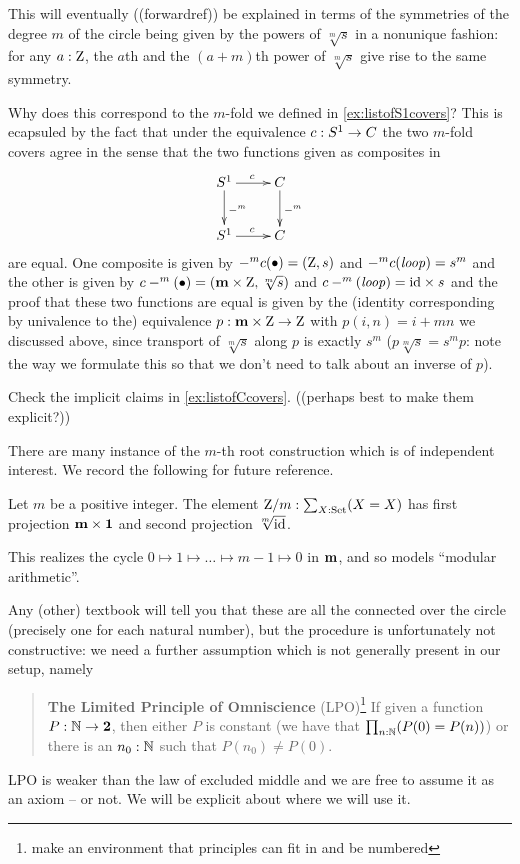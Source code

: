 \begin{example}
This will eventually ((forwardref)) be explained in terms of the symmetries of the degree $m$ \covering of the circle being given by the powers of $\sqrt[m]s$ in a nonunique fashion: 
for any $a:\mathrm{Z}$, the $a$th and the $(a+m)$th power of $\sqrt[m]s$ give rise to the same symmetry.


Why does this correspond to the $m$-fold \covering we defined in \cref{ex:listofS1covers}?  This is ecapsuled by the fact that under the equivalence $c:S^1\to C$ the two $m$-fold covers agree in the sense that the two functions given as composites in
$$\xymatrix{\Sc\ar[r]^c\ar[d]^{-^m}&C\ar[d]^{-^m}\\\Sc\ar[r]^c&C}$$ are equal.  One composite is given by $-^mc(\bullet)=(\mathrm{Z},s)$ and $-^mc(\mathit{loop})=s^m$ and the other is given by $c-^m(\bullet)=(\mathbf{m}\times\mathrm{Z},\sqrt[m]s)$ and $c-^m(\mathit{loop})=\mathord{\mathrm{id}}\times s$ and the proof that these two functions are equal is given by the (identity corresponding by univalence to the) equivalence  $p:\mathbf{m}\times \mathrm{Z}\to\mathrm{Z}$ with $p(i,n)=i+mn$ we discussed above, since transport of $\sqrt[m]s$ along $p$ is exactly $s^m$ (\ie $p\sqrt[m]s=s^mp$: note the way we formulate this so that we don't need to talk about an inverse of $p$).
\end{example}
\begin{xca}
  Check the implicit claims in \cref{ex:listofCcovers}.  ((perhaps best to make them explicit?))
\end{xca}
There are many instance of the $m$-th root construction which is of independent interest.  We record the following for future reference.
\begin{definition}
  \label{def:Zetmodm}
  Let $m$ be a positive integer.
  The element $\mathrm{Z}/m:\sum_{X:\mathord{\mathrm{Set}}}(X=X)$ has first projection $\mathbf{m}\times\mathbf{1}$ and second projection $\sqrt[m]{\mathord{\mathrm{id}}}$.
\end{definition}
This realizes the cycle $0\mapsto1\mapsto\dots\mapsto m-1\mapsto 0$ in $\mathbf{m}$, and so models ``modular arithmetic''.


Any (other) textbook will tell you that these are all the connected \coverings over the circle (precisely one for each natural number), but the procedure is unfortunately not constructive: we need a further assumption which is not generally present in our setup, namely

\begin{quote}
  {\bf The Limited Principle of Omniscience} (LPO)\label{LPO}\footnote{make an environment that principles can fit in and be numbered} If given a function $P:\mathbb{N}\to\mathbf{2}$, then either $P$ is constant (we have that $\prod_{n:\mathbb{N}}(P(0)=P(n))$) or there is an $n_0:\mathbb{N}$ such that $P(n_0)\neq P(0)$.
\end{quote}
LPO is weaker than the law of excluded middle and we are free to assume it as an axiom -- or not.  We will be explicit about where we will use it.


